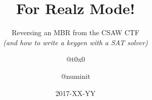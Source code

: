 \documentclass{beamer}
\title{For Realz Mode!}
\subtitle{
    Reversing an MBR from the CSAW CTF\\
    {\em (and how to write a keygen with a SAT solver)}
}
\author{@t0x0 \and @numinit}
\institute{\VaporSec}
\date{2017-XX-YY}
\begin{document}
\begin{frame}
    \titlepage
\end{frame}




\end{document}
